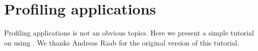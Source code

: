 \documentclass[a4paper,10pt,twoside]{book}
\begin{document}
	\sloppy
\fi
\chapter{Profiling applications}

Profiling applications is not an obvious topics. Here we present a simple tutorial on using 
. We thanks Andreas Raab for the original version of this tutorial.



\end{document}
